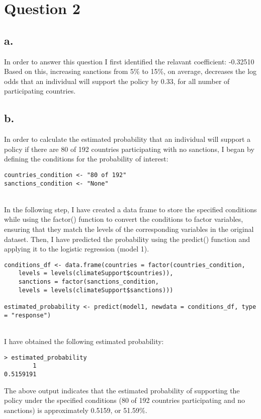 \documentclass[oneside]{article}
\begin{document}
\section*{Question 2}
\subsection{a.}
In order to answer this question I first identified the relavant coefficient: 
-0.32510
\\
Based on this, increasing sanctions from 5\% to 15\%, on average, decreases the log odds that an individual will support the policy by 0.33, for all number of participating countries. 

\subsection{b.}
In order to calculate the estimated probability that an individual will support a policy if there are 80 of 192 countries participating with no sanctions, I began by defining the conditions for the probability of interest:
\begin{verbatim}
countries_condition <- "80 of 192"
sanctions_condition <- "None"  
\end{verbatim}
\\
In the following step, I have created a data frame to store the specified conditions while using the factor() function to convert the conditions to factor variables, ensuring that they match the levels of the corresponding variables in the original dataset. Then, I have predicted the probability using the predict() function and applying it to the logistic regression (model 1).
\begin{verbatim}
conditions_df <- data.frame(countries = factor(countries_condition, 
    levels = levels(climateSupport$countries)),
    sanctions = factor(sanctions_condition,
    levels = levels(climateSupport$sanctions)))   

estimated_probability <- predict(model1, newdata = conditions_df, type = "response")

\end{verbatim}
\\
I have obtained the following estimated probability:
\begin{verbatim}
> estimated_probability
        1 
0.5159191 
\end{verbatim}
The above output indicates that the estimated probability of supporting the policy under the specified conditions (80 of 192 countries participating and no sanctions) is approximately 0.5159, or 51.59\%.
\end{document}

